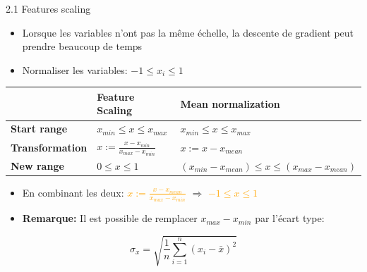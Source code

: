 \begin{frame}{2.1 Features scaling}
  \begin{itemize}
  \item Lorsque les variables n'ont pas la même échelle, la descente de gradient peut prendre beaucoup de temps
  \item Normaliser les variables: $-1 \leq x_{i} \leq 1$
  \end{itemize}
  \vspace{-0.2cm}
  \begin{table}
    \footnotesize
        {\def\arraystretch{2}\tabcolsep=8pt
          \begin{tabular}{l|l|l}
            & \textbf{Feature Scaling} & \textbf{Mean normalization}\\
            \hline
            \textbf{Start range} & $x_{min} \leq x \leq x_{max}$ & $x_{min} \leq x \leq x_{max}$ \\
            \textbf{Transformation} & $x := \frac{x - x_{min}}{x_{max} - x_{min}}$ & $x := x - x_{mean}$ \\
            \textbf{New range} & $0 \leq x \leq 1$ & $(x_{min}-x_{mean}) \leq x \leq (x_{max}-x_{mean})$
          \end{tabular}
        }
  \end{table}
  \vspace{-0.2cm}
  \begin{itemize}
  \item En combinant les deux: \boldmath \textcolor{orange}{$x := \frac{x - x_{mean}}{x_{max} - x_{min}}$} $\Rightarrow$ \textcolor{orange}{$-1 \leq x \leq 1$} 
    \vspace{0.2cm}
    \footnotesize
  \item\textbf{Remarque:} Il est possible de remplacer $x_{max} - x_{min}$ par l'écart type:
  \end{itemize}
  \footnotesize
  \begin{equation*}
    \sigma_{x} = \sqrt{\frac{1}{n}\displaystyle\sum_{i=1}^{n}(x_{i} - \bar{x})^{2}}
  \end{equation*}
\end{frame}

